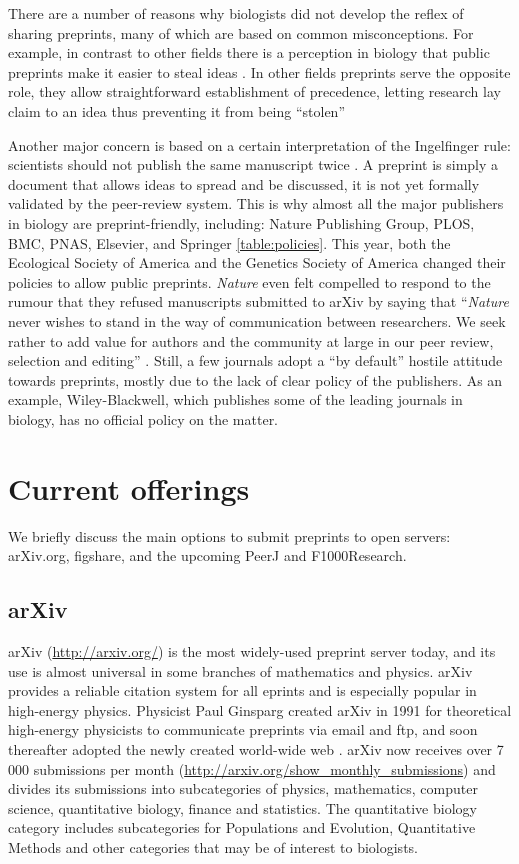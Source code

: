 \documentclass[10pt]{article}
\begin{document}
There are a number of reasons why biologists did not develop the reflex of
sharing preprints, many of which are based on common misconceptions. For
example, in contrast to other fields there is a perception in biology that
public preprints make it easier to steal ideas \cite{gin11}. In other fields
preprints serve the opposite role, they allow straightforward establishment of
precedence, letting research lay claim to an idea thus preventing it from being
``stolen'' \cite{gin11}

Another major concern is based on a certain interpretation of the Ingelfinger
rule: scientists should not publish the same manuscript twice \cite{alt96}. A
preprint is simply a document that allows ideas to spread and be discussed, it
is not yet formally validated by the peer-review system. This is why almost all
the major publishers in biology are preprint-friendly, including: Nature
Publishing Group, PLOS, BMC, PNAS, Elsevier, and Springer \ref{table:policies}.
This year, both the Ecological Society of America and the Genetics Society of
America changed their policies to allow public preprints. \emph{Nature} even
felt compelled to respond to the rumour that they refused manuscripts submitted
to arXiv by saying that ``\emph{Nature} never wishes to stand in the way of
communication between researchers. We seek rather to add value for authors and
the community at large in our peer review, selection and editing'' \cite{nat05}.
Still, a few journals adopt a ``by default'' hostile attitude towards preprints,
mostly due to the lack of clear policy of the publishers. As an example,
Wiley-Blackwell, which publishes some of the leading journals in biology, has no
official policy on the matter.

\section*{Current offerings}

We briefly discuss the main options to submit preprints to open servers:
arXiv.org, figshare, and the upcoming PeerJ and F1000Research.

\subsection*{arXiv}

arXiv (\url{http://arxiv.org/}) is the most widely-used preprint server today,
and its use is almost universal in some branches of mathematics and physics.
arXiv provides a reliable citation system for all eprints and is especially
popular in high-energy physics. Physicist Paul Ginsparg created arXiv in 1991
for theoretical high-energy physicists to communicate preprints via email and
ftp, and soon thereafter adopted the newly created world-wide web
\cite{jackson2002preprints}.  arXiv now receives over 7 000 submissions per
month (\url{http://arxiv.org/show_monthly_submissions}) and divides its
submissions into subcategories of physics, mathematics, computer science,
quantitative biology, finance and statistics.  The quantitative biology category
includes subcategories for Populations and Evolution, Quantitative Methods and
other categories that may be of interest to biologists.
\end{document}
